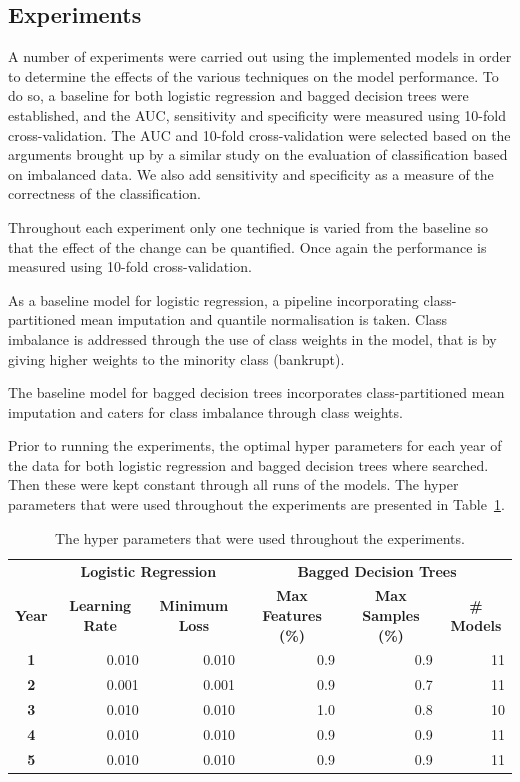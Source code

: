 \documentclass{article}[paper=a4,pagesize=auto,10pt]
\begin{document}
\subsection{Experiments} \label{Experiments}

A number of experiments were carried out using the implemented models in order to determine the effects of the various techniques on the model performance. To do so, a baseline for both logistic regression and bagged decision trees were established, and the AUC, sensitivity and specificity were measured using 10-fold cross-validation. The AUC and 10-fold cross-validation were selected based on the arguments brought up by a similar study \cite{zikeba2016ensemble} on the evaluation of classification based on imbalanced data. We also add sensitivity and specificity as a measure of the correctness of the classification. \medskip

Throughout each experiment only one technique is varied from the baseline so that the effect of the change can be quantified. Once again the performance is measured using 10-fold cross-validation. \medskip

As a baseline model for logistic regression, a pipeline incorporating class-partitioned mean imputation and quantile normalisation is taken. Class imbalance is addressed through the use of class weights in the model, that is by giving higher weights to the minority class (bankrupt).\medskip

The baseline model for bagged decision trees incorporates class-partitioned mean imputation and caters for class imbalance through class weights.

Prior to running the experiments, the optimal hyper parameters for each year of the data for both logistic regression and bagged decision trees where searched. Then these were kept constant through all runs of the models. The hyper parameters that were used throughout the experiments are presented in Table~\ref{tab:hyperparam}.

\begin{table}[]
\begin{tabular}{crr|rrr}
\toprule
\multicolumn{1}{l}{\textbf{}} & \multicolumn{2}{c|}{\textbf{Logistic Regression}} & \multicolumn{3}{c}{\textbf{Bagged Decision Trees}} \\
\textbf{Year} & \multicolumn{1}{c}{\textbf{Learning Rate}} & \multicolumn{1}{c}{\textbf{Minimum Loss}} & \multicolumn{1}{c}{\textbf{Max Features (\%)}} & \multicolumn{1}{c}{\textbf{Max Samples (\%)}} & \multicolumn{1}{c}{\textbf{\# Models}} \\
\midrule
\textbf{1} & 0.010 & 0.010 & 0.9 & 0.9 & 11 \\
\textbf{2} & 0.001 & 0.001 & 0.9 & 0.7 & 11 \\
\textbf{3} & 0.010 & 0.010 & 1.0 & 0.8 & 10 \\
\textbf{4} & 0.010 & 0.010 & 0.9 & 0.9 & 11 \\
\textbf{5} & 0.010 & 0.010 & 0.9 & 0.9 & 11 \\
\bottomrule
\end{tabular}
\caption{The hyper parameters that were used throughout the experiments.}
\label{tab:hyperparam}
\end{table}
\end{document}
